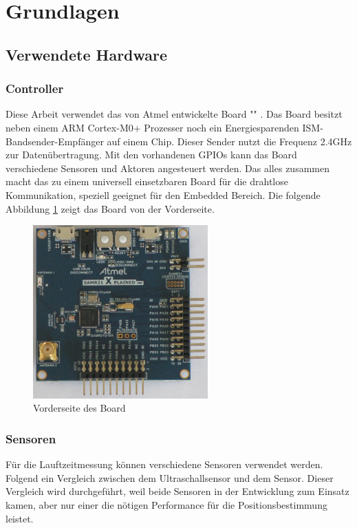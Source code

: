 \newpage
\section{Grundlagen}

\subsection{Verwendete Hardware}
\subsubsection{Controller}
Diese Arbeit verwendet das von Atmel entwickelte Board "\board" \cite{src_SAMR}. Das Board besitzt neben einem ARM Cortex-M0+ Prozesser noch ein Energiesparenden ISM-Bandsender-Empfänger auf einem Chip. Dieser Sender nutzt die Frequenz 2.4GHz zur Datenübertragung. Mit den vorhandenen GPIOs kann das Board verschiedene Sensoren und Aktoren angesteuert werden. Das alles zusammen macht das \board \platz zu einem universell einsetzbaren Board für die drahtlose Kommunikation, speziell geeignet für den Embedded Bereich. Die folgende Abbildung \ref{img:samr21} zeigt das \board Board von der Vorderseite.
\begin{figure}[!ht]
	\centering
	\includegraphics[width=0.6\textwidth]{images/samr21.png}
	\caption{Vorderseite des \board Board}
	\label{img:samr21}
\end{figure}

\subsubsection{Sensoren}
Für die Lauftzeitmessung können verschiedene Sensoren verwendet werden. Folgend ein Vergleich zwischen dem Ultraschallsensor \ultraschall \platz und dem \microphone \platz Sensor. Dieser Vergleich wird durchgeführt, weil beide Sensoren in der Entwicklung zum Einsatz kamen, aber nur einer die nötigen Performance für die Positionsbestimmung leistet.

